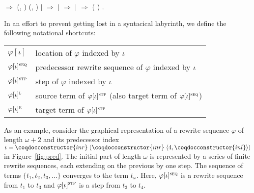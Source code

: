 \begin{singlespace}
\begin{coqdoccode}
\ensuremath{\Rightarrow}
\coqdocvar{\_} (, )
(\coqdocvariable{$\psi$}, \coqdocvariable{$\pi$})\coqdoceol
\coqdocindent{10.00em}
\ensuremath{|}
\coqdocvar{$\kappa$}  \ensuremath{\Rightarrow}
 \coqdocvariable{$\psi$}
\coqdocvariable{$\kappa$}\coqdoceol
\coqdocindent{10.00em}
\coqdoceol
\coqdocindent{1.00em}
\ensuremath{|}  \coqdocvar{\_}
\coqdocvar{\_} \coqdocvar{\_}  \coqdocvar{\_}
\ensuremath{\Rightarrow}
 \coqdocvariable{$\iota$} \coqdoceol
\coqdocindent{10.00em}
\ensuremath{|}
 \coqdocvar{$\kappa$} \ensuremath{\Rightarrow}
 (
) \coqdocvariable{$\kappa$}\coqdoceol
\coqdocindent{10.00em}
\coqdoceol
\coqdocindent{1.00em}
.\coqdoceol
\end{coqdoccode}
\end{singlespace}

In an effort to prevent getting lost in a syntacical labyrinth, we define
the following notational shortcuts:

{\renewcommand{\arraystretch}{1.1}
\renewcommand{\tabcolsep}{10pt}
\begin{tabular}{ll}
$\varphi[\iota]$ & location of $\varphi$ indexed by $\iota$\\
$\varphi[\iota]^\textsc{seq}$ & predecessor rewrite sequence of $\varphi$ indexed by $\iota$\\
$\varphi[\iota]^\textsc{stp}$ & step of $\varphi$ indexed by $\iota$\\
$\varphi[\iota]^\textsc{l}$ & source term of $\varphi[\iota]^\textsc{stp}$ (also target term
  of $\varphi[\iota]^\textsc{seq}$)\\
$\varphi[\iota]^\textsc{r}$ & target term of $\varphi[\iota]^\textsc{stp}$
\end{tabular}}

As an example, consider the graphical representation of a rewrite
sequence $\varphi$ of length $\omega + 2$ and its predecessor index
$\iota = \coqdocconstructor{inr} \; (\coqdocconstructor{inr} \;
\langle 4, \coqdocconstructor{inl}\rangle)$ in
Figure~\ref{fig:pred}. The initial part of length $\omega$ is
represented by a series of finite rewrite sequences, each extending on
the previous by one step. The sequence of terms $\{ t_1,t_2, t_3,
\ldots \}$ converges to the term $t_\omega$.
Here, $\varphi[\iota]^\textsc{seq}$ is a rewrite sequence from $t_1$ to
$t_3$ and $\varphi[\iota]^\textsc{stp}$ is a step from $t_3$ to
$t_4$.

